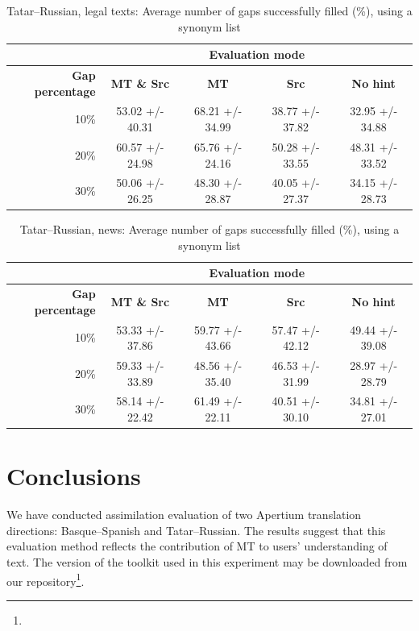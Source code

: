 \documentclass[11pt]{article}
\newcommand{\comment}[1]{\marginpar{\scriptsize\sf \textcolor{blue}{#1}}}
\begin{document}
\begin{table}
\centering
\begin{tabular}{|r |*{4}{c}|}
\hline
  &\multicolumn{4}{c|}{\textbf{Evaluation mode}}\\
\hline
\textbf{Gap percentage} & \textbf{MT \& Src} & \textbf{MT} & \textbf{Src} & \textbf{No hint} \\
10\%&53.02 +/- 40.31&68.21 +/- 34.99&38.77 +/- 37.82&32.95 +/- 34.88\\
20\%&60.57 +/- 24.98&65.76 +/- 24.16&50.28 +/- 33.55&48.31 +/- 33.52\\
30\%&50.06 +/- 26.25&48.30 +/- 28.87&40.05 +/- 27.37&34.15 +/- 28.73\\
\hline
\end{tabular}
\caption {Tatar--Russian, legal texts: Average number of gaps successfully filled (\%), using a synonym list} \label{table:rus-legal} 
\end{table}

\begin{table}
\centering
\begin{tabular}{|r |*{4}{c}|}
\hline
  &\multicolumn{4}{c|}{\textbf{Evaluation mode}}\\
\hline
\textbf{Gap percentage} & \textbf{MT \& Src} & \textbf{MT} & \textbf{Src} & \textbf{No hint} \\
10\%&53.33 +/- 37.86&59.77 +/- 43.66&57.47 +/- 42.12&49.44 +/- 39.08\\
20\%&59.33 +/- 33.89&48.56 +/- 35.40&46.53 +/- 31.99&28.97 +/- 28.79\\
30\%&58.14 +/- 22.42&61.49 +/- 22.11&40.51 +/- 30.10&34.81 +/- 27.01\\
\hline
\end{tabular}
\caption {Tatar--Russian, news: Average number of gaps successfully filled (\%), using a synonym list} \label{table:rus-news} 
\end{table}

\section{Conclusions}
\label{sec:conclusion}
We have conducted assimilation evaluation of two Apertium translation directions: Basque--Spanish and Tatar--Russian. The results suggest that this evaluation method reflects the contribution of MT to users' understanding of text. The version of the toolkit used in this 
\comment{EA to JA: by our repository I mean my github, is that ok?}
experiment may be downloaded from our repository\footnote{}.
\end{document}
